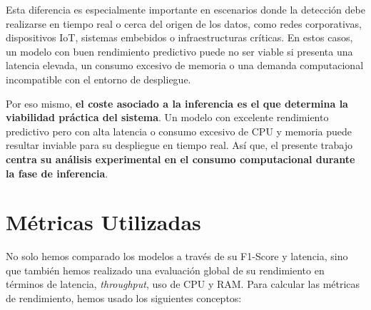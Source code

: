 Esta diferencia es especialmente importante en escenarios donde la detección debe realizarse en tiempo real o cerca del origen de los datos, como redes corporativas, dispositivos IoT, sistemas embebidos o infraestructuras críticas. En estos casos, un modelo con buen rendimiento predictivo puede no ser viable si presenta una latencia elevada, un consumo excesivo de memoria o una demanda computacional incompatible con el entorno de despliegue.

Por eso mismo, \textbf{el coste asociado a la inferencia es el que determina la viabilidad práctica del sistema}. Un modelo con excelente rendimiento predictivo pero con alta latencia o consumo excesivo de CPU y memoria puede resultar inviable para su despliegue en tiempo real. Así que, el presente trabajo \textbf{centra su análisis experimental en el consumo computacional durante la fase de inferencia}.

\section{Métricas Utilizadas}

No solo hemos comparado los modelos a través de su F1-Score y latencia, sino que también hemos realizado una evaluación global de su rendimiento en términos de latencia, \textit{throughput}, uso de CPU y RAM. Para calcular las métricas de rendimiento, hemos usado los siguientes conceptos:

